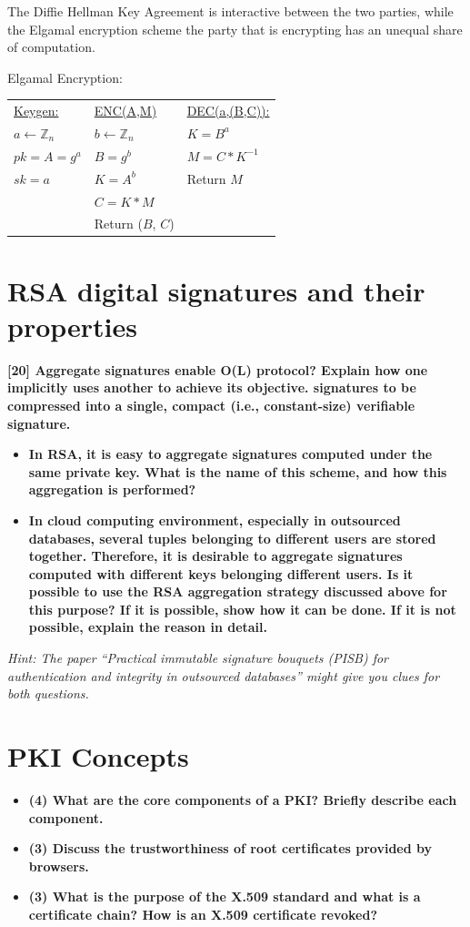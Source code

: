 \documentclass[letterpaper,11pt,notitlepage,fleqn]{article}
\begin{document}
The Diffie Hellman Key Agreement is interactive between the two parties, while the Elgamal encryption scheme the party that is encrypting has an unequal share of computation. 

\noindent Elgamal Encryption: \\
\begin{tabular}{l l l}
    \underline{Keygen:} & \underline{ENC(A,M)} & \underline{DEC(a,(B,C)):} \\ 
    $a \leftarrow \mathbb{Z}_{n}$ & $b \leftarrow \mathbb{Z}_{n}$ & $K = B^a$ \\
    $pk = A = g^a$ & $B = g^b$ & $M = C \ast K^{-1}$ \\
    $sk = a$ & $K = A^b$ & Return $M$ \\
    & $C = K \ast M$ & \\
    & Return ($B$, $C$) &
    
\end{tabular}


\section{RSA digital signatures and their properties}
\noindent \textbf{[20] Aggregate  signatures  enable  O(L) 
protocol? Explain how one implicitly uses another to achieve its objective.  
signatures to be compressed into a single, compact (i.e., constant-size) verifiable signature.}
\begin{itemize}
    \item \textbf{In  RSA,  it  is  easy  to  aggregate  signatures  computed  under  the  same  private key. What is the name of this scheme, and how this aggregation is performed?}
    \item \textbf{In cloud computing environment, especially  in outsourced databases, several tuples  belonging  to  different  users  are  stored  together.  Therefore,  it  is desirable  to  aggregate  signatures  computed  with  different  keys  belonging different  users.  Is  it  possible  to  use  the  RSA  aggregation  strategy  discussed above  for  this  purpose?  If  it  is  possible,  show  how  it  can  be  done.  If  it  is  not possible, explain the reason in
        detail.}
\end{itemize}
\textit{Hint:  The  paper  “Practical  immutable  signature  bouquets  (PISB)  for authentication and integrity in outsourced databases” might give you clues for both questions.}

\section{PKI Concepts}
\begin{itemize}
    \item \textbf{(4)  What  are  the  core  components  of  a  PKI?  Briefly  describe  each component.}
    \item \textbf{(3) Discuss the trustworthiness of root certificates provided by browsers.}
    \item \textbf{(3)  What  is  the  purpose  of  the  X.509  standard  and  what  is  a  certificate chain? How is an X.509 certificate revoked?}
\end{itemize}


\medskip


\end{document}
